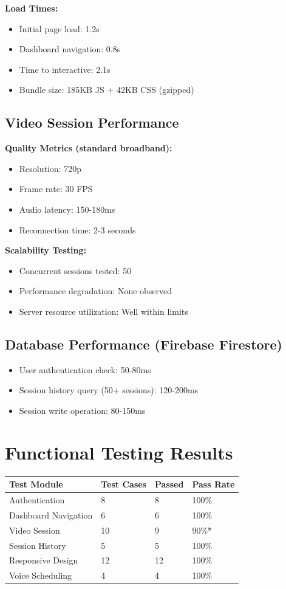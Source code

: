 \documentclass[11pt,a4paper]{report}
\begin{document}
\textbf{Load Times:}
\begin{itemize}
    \item Initial page load: 1.2s
    \item Dashboard navigation: 0.8s
    \item Time to interactive: 2.1s
    \item Bundle size: 185KB JS + 42KB CSS (gzipped)
\end{itemize}

\subsection{Video Session Performance}

\textbf{Quality Metrics (standard broadband):}
\begin{itemize}
    \item Resolution: 720p
    \item Frame rate: 30 FPS
    \item Audio latency: 150-180ms
    \item Reconnection time: 2-3 seconds
\end{itemize}

\textbf{Scalability Testing:}
\begin{itemize}
    \item Concurrent sessions tested: 50
    \item Performance degradation: None observed
    \item Server resource utilization: Well within limits
\end{itemize}

\subsection{Database Performance (Firebase Firestore)}
\begin{itemize}
    \item User authentication check: 50-80ms
    \item Session history query (50+ sessions): 120-200ms
    \item Session write operation: 80-150ms
\end{itemize}

\section{Functional Testing Results}

\begin{longtable}{p{4cm}p{2.5cm}p{2cm}p{2.5cm}}
\toprule
\textbf{Test Module} & \textbf{Test Cases} & \textbf{Passed} & \textbf{Pass Rate} \\
\midrule
Authentication & 8 & 8 & 100\% \\
Dashboard Navigation & 6 & 6 & 100\% \\
Video Session & 10 & 9 & 90\%* \\
Session History & 5 & 5 & 100\% \\
Responsive Design & 12 & 12 & 100\% \\
Voice Scheduling & 4 & 4 & 100\% \\
\bottomrule
\end{longtable}
\end{document}
